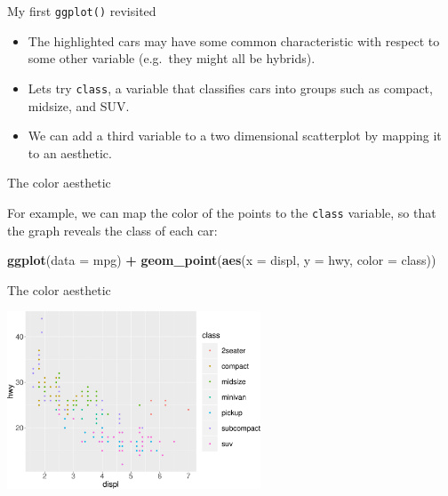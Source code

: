 \documentclass[ignorenonframetext,]{beamer}
\newenvironment{Shaded}{\begin{snugshade}}{\end{snugshade}}
\newcommand{\DataTypeTok}[1]{\textcolor[rgb]{0.13,0.29,0.53}{#1}}
\newcommand{\KeywordTok}[1]{\textcolor[rgb]{0.13,0.29,0.53}{\textbf{#1}}}
\newcommand{\NormalTok}[1]{#1}
\newcommand{\OperatorTok}[1]{\textcolor[rgb]{0.81,0.36,0.00}{\textbf{#1}}}
\newcommand{\StringTok}[1]{\textcolor[rgb]{0.31,0.60,0.02}{#1}}
\begin{document}
\begin{frame}[fragile]{My first \texttt{ggplot()} revisited}
\protect\hypertarget{my-first-ggplot-revisited-1}{}

\begin{itemize}
\item
  The highlighted cars may have some common characteristic with respect
  to some other variable (e.g.~they might all be hybrids).
\item
  Lets try \texttt{class}, a variable that classifies cars into groups
  such as compact, midsize, and SUV.
\item
  We can add a third variable to a two dimensional scatterplot by
  mapping it to an aesthetic.
\end{itemize}

\end{frame}

\begin{frame}[fragile]{The color aesthetic}
\protect\hypertarget{the-color-aesthetic}{}

For example, we can map the color of the points to the \texttt{class}
variable, so that the graph reveals the class of each car:

\begin{Shaded}
\begin{Highlighting}[]
\KeywordTok{ggplot}\NormalTok{(}\DataTypeTok{data =}\NormalTok{ mpg) }\OperatorTok{+}
\StringTok{  }\KeywordTok{geom_point}\NormalTok{(}\KeywordTok{aes}\NormalTok{(}\DataTypeTok{x =}\NormalTok{ displ, }\DataTypeTok{y =}\NormalTok{ hwy, }\DataTypeTok{color =}\NormalTok{ class))}
\end{Highlighting}
\end{Shaded}

\end{frame}

\begin{frame}{The color aesthetic}
\protect\hypertarget{the-color-aesthetic-1}{}

\begin{center}\includegraphics[height=200px]{data-visualization_files/figure-beamer/unnamed-chunk-8-1} \end{center}

\end{frame}
\end{document}
